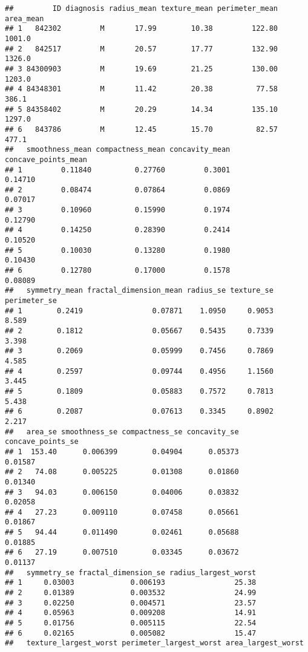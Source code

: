 \documentclass[]{article}
\begin{document}
\begin{verbatim}
##         ID diagnosis radius_mean texture_mean perimeter_mean area_mean
## 1   842302         M       17.99        10.38         122.80    1001.0
## 2   842517         M       20.57        17.77         132.90    1326.0
## 3 84300903         M       19.69        21.25         130.00    1203.0
## 4 84348301         M       11.42        20.38          77.58     386.1
## 5 84358402         M       20.29        14.34         135.10    1297.0
## 6   843786         M       12.45        15.70          82.57     477.1
##   smoothness_mean compactness_mean concavity_mean concave_points_mean
## 1         0.11840          0.27760         0.3001             0.14710
## 2         0.08474          0.07864         0.0869             0.07017
## 3         0.10960          0.15990         0.1974             0.12790
## 4         0.14250          0.28390         0.2414             0.10520
## 5         0.10030          0.13280         0.1980             0.10430
## 6         0.12780          0.17000         0.1578             0.08089
##   symmetry_mean fractal_dimension_mean radius_se texture_se perimeter_se
## 1        0.2419                0.07871    1.0950     0.9053        8.589
## 2        0.1812                0.05667    0.5435     0.7339        3.398
## 3        0.2069                0.05999    0.7456     0.7869        4.585
## 4        0.2597                0.09744    0.4956     1.1560        3.445
## 5        0.1809                0.05883    0.7572     0.7813        5.438
## 6        0.2087                0.07613    0.3345     0.8902        2.217
##   area_se smoothness_se compactness_se concavity_se concave_points_se
## 1  153.40      0.006399        0.04904      0.05373           0.01587
## 2   74.08      0.005225        0.01308      0.01860           0.01340
## 3   94.03      0.006150        0.04006      0.03832           0.02058
## 4   27.23      0.009110        0.07458      0.05661           0.01867
## 5   94.44      0.011490        0.02461      0.05688           0.01885
## 6   27.19      0.007510        0.03345      0.03672           0.01137
##   symmetry_se fractal_dimension_se radius_largest_worst
## 1     0.03003             0.006193                25.38
## 2     0.01389             0.003532                24.99
## 3     0.02250             0.004571                23.57
## 4     0.05963             0.009208                14.91
## 5     0.01756             0.005115                22.54
## 6     0.02165             0.005082                15.47
##   texture_largest_worst perimeter_largest_worst area_largest_worst

\end{verbatim}
\end{document}
